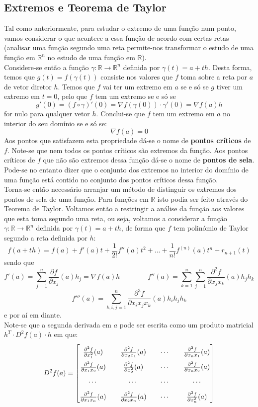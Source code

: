 \documentclass{article}
\newcommand{\R}{\mathbb{R}}
\begin{document}
\subsection{Extremos e Teorema de Taylor}
Tal como anteriormente, para estudar o extremo de uma função num ponto, vamos considerar o que acontece a essa função de acordo com certas retas (analisar uma função segundo uma reta permite-nos transformar o estudo de uma função em $\R^n$ no estudo de uma função em $\R$).\\
Considere-se então a função $\gamma: \R \to \R^n$ definida por $\gamma (t) = a + th$. Desta forma, temos que $g(t) = f(\gamma(t))$ consiste nos valores que $f$ toma sobre a reta por $a$ de vetor diretor $h$. Temos que $f$ vai ter um extremo em $a$ se e só se $g$ tiver um extremo em $t=0$, pelo que $f$ tem um extremo se e só se
$$
g'(0) = (f \circ \gamma )' (0) = \nabla f(\gamma (0)) \cdot \gamma'(0) = \nabla f(a) h
$$
for nulo para qualquer vetor $h$. Conclui-se que $f$ tem um extremo em $a$ no interior do seu domínio se e só se:
$$
\nabla f(a)=0
$$
Aos pontos que satisfazem esta propriedade dá-se o nome de \textbf{pontos críticos} de $f$. Note-se que nem todos os pontos críticos são extremos da função. Aos pontos críticos de $f$ que não são extremos dessa função dá-se o nome de \textbf{pontos de sela}. Pode-se no entanto dizer que o conjunto dos extremos no interior do domínio de uma função está contido no conjunto dos pontos críticos dessa função.\\
Torna-se então necessário arranjar um método de distinguir os extremos dos pontos de sela de uma função. Para funções em $\R$ isto podia ser feito através do Teorema de Taylor. Voltamos então a restringir a análise da função aos valores que esta toma segundo uma reta, ou seja, voltamos a considerar a função $\gamma: \R \to \R^n$ definida por $\gamma (t) = a + th$, de forma que $f$ tem polinómio de Taylor segundo a reta definida por $h$:
$$
f(a+th) = f(a) + f'(a)t + \frac{1}{2!}f''(a)t^2 + ... + \frac{1}{n!} f^{(n)}(a)t^n + r_{n+1}(t)
$$
sendo que
$$
f'(a) = \sum_{j=1}^n \frac{\partial f}{\partial x_j}(a) h_j = \nabla f(a) h  \quad \quad \quad \quad 
f''(a) = \sum_{k=1}^n \sum_{j=1}^n \frac{\partial ^2 f}{\partial x_j x_k} (a) h_j h_k 
$$
$$
f'''(a) = \sum_{k,i,j =1}^n \frac{\partial ^3 f}{\partial x_i x_j x_k} (a) h_i h_j h_k
$$
e por aí em diante.\\
Note-se que a segunda derivada em $a$ pode ser escrita como um produto matricial $h^T \cdot D^2 f(a) \cdot h$ em que:
$$
D^2 f(a) = 
\renewcommand*{\arraystretch}{1.8}
\begin{bmatrix}
\frac{\partial ^2 f}{\partial x_1 ^2} (a) && \frac{\partial ^2 f}{\partial x_2 x_1} (a) && \cdots && \frac{\partial ^2 f}{\partial x_n x_1} (a) \\
\frac{\partial ^2 f}{\partial x_1 x_2} (a) && \frac{\partial ^2 f}{\partial x_2^2} (a) && \cdots && \frac{\partial ^2 f}{\partial x_n x_2} (a) \\
\cdots && \cdots && \cdots && \cdots \\
\frac{\partial ^2 f}{\partial x_1 x_n} (a) && \frac{\partial ^2 f}{\partial x_2 x_n} (a) && \cdots && \frac{\partial ^2 f}{\partial x_n ^2} (a)
\end{bmatrix}
$$
\end{document}
